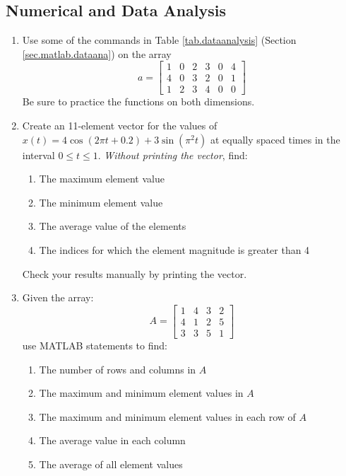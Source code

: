 \subsection{Numerical and Data Analysis}
\begin{enumerate}
    \item Use some of the commands in Table \ref{tab.dataanalysis} (Section \nolinebreak[3] \ref{sec.matlab.dataana}) on the array
        \begin{equation*}
        a = \left[ \begin{array}{cccccc}
                    1&0&2&3&0&4\\
                    4&0&3&2&0&1\\
                    1&2&3&4&0&0 \end{array} \right]
        \end{equation*}
    Be sure to practice the functions on both dimensions.
    \item Create an 11-element vector for the values of $x(t) = 4\cos(2\pi t+0.2) + 3\sin(\pi^2 t)$ at equally spaced times in the interval $0\leq t \leq 1$.  \textit{Without printing the vector}, find:
    \begin{enumerate}
        \item The maximum element value
        \item The minimum element value
        \item The average value of the elements
        \item The indices for which the element magnitude is greater than 4
    \end{enumerate}
    Check your results manually by printing the vector.
    \item Given the array:
        \begin{equation*}
        A = \left[ \begin{array}{cccc}1&4&3&2\\4&1&2&5\\3&3&5&1 \end{array} \right]
        \end{equation*}
    use MATLAB statements to find:
        \begin{enumerate}
        \item The number of rows and columns in $A$
        \item The maximum and minimum element values in $A$
        \item The maximum and minimum element values in each row of $A$
        \item The average value in each column
        \item The average of all element values
        \end{enumerate}
\end{enumerate}

